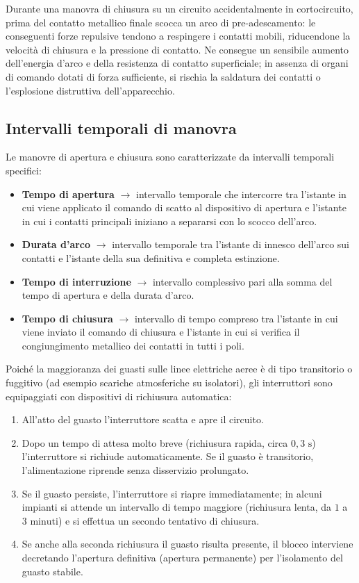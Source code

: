 Durante una manovra di chiusura su un circuito accidentalmente in cortocircuito, prima del contatto metallico finale scocca un arco di pre-adescamento: le conseguenti forze repulsive tendono a respingere i contatti mobili, riducendone la velocità di chiusura e la pressione di contatto. Ne consegue un sensibile aumento dell'energia d'arco e della resistenza di contatto superficiale; in assenza di organi di comando dotati di forza sufficiente, si rischia la saldatura dei contatti o l'esplosione distruttiva dell'apparecchio.

\subsection{Intervalli temporali di manovra}
Le manovre di apertura e chiusura sono caratterizzate da intervalli temporali specifici:
\begin{itemize}
    \item \textbf{Tempo di apertura} $\rightarrow$ intervallo temporale che intercorre tra l'istante in cui viene applicato il comando di scatto al dispositivo di apertura e l'istante in cui i contatti principali iniziano a separarsi con lo scocco dell'arco.
    \item \textbf{Durata d'arco} $\rightarrow$ intervallo temporale tra l'istante di innesco dell'arco sui contatti e l'istante della sua definitiva e completa estinzione.
    \item \textbf{Tempo di interruzione} $\rightarrow$ intervallo complessivo pari alla somma del tempo di apertura e della durata d'arco.
    \item \textbf{Tempo di chiusura} $\rightarrow$ intervallo di tempo compreso tra l'istante in cui viene inviato il comando di chiusura e l'istante in cui si verifica il congiungimento metallico dei contatti in tutti i poli.
\end{itemize}

Poiché la maggioranza dei guasti sulle linee elettriche aeree è di tipo transitorio o fuggitivo (ad esempio scariche atmosferiche su isolatori), gli interruttori sono equipaggiati con dispositivi di richiusura automatica:
\begin{enumerate}
    \item All'atto del guasto l'interruttore scatta e apre il circuito.
    \item Dopo un tempo di attesa molto breve (richiusura rapida, circa $0{,}3\text{ s}$) l'interruttore si richiude automaticamente. Se il guasto è transitorio, l'alimentazione riprende senza disservizio prolungato.
    \item Se il guasto persiste, l'interruttore si riapre immediatamente; in alcuni impianti si attende un intervallo di tempo maggiore (richiusura lenta, da $1$ a $3\text{ minuti}$) e si effettua un secondo tentativo di chiusura.
    \item Se anche alla seconda richiusura il guasto risulta presente, il blocco interviene decretando l'apertura definitiva (apertura permanente) per l'isolamento del guasto stabile.
\end{enumerate}


